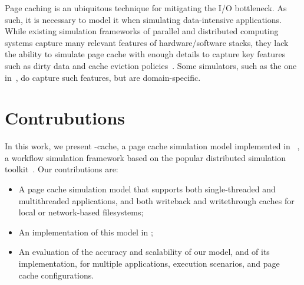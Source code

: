 Page caching is an ubiquitous technique for mitigating the I/O bottleneck.
As such, it is necessary to model it
when simulating data-intensive applications.
While existing simulation frameworks of parallel and distributed computing
systems  capture many relevant features of hardware/software stacks, 
they lack the ability to simulate page cache with enough details to capture key features such
as dirty data and cache eviction policies~\cite{nunez2012simcan,nunez2012icancloud}. 
Some simulators, such as the one in~\cite{xu2018saving}, do capture such features,
but are domain-specific. 


\section{Contrubutions}

In this work, we present \wrench-cache, a page cache simulation model
implemented in \wrench~\cite{casanova2020fgcs}, a workflow simulation
framework based on the popular \simgrid distributed simulation
toolkit~\cite{casanova2014simgrid}. Our contributions are:

\begin{itemize}
    \item A page cache simulation model that supports 
both single-threaded and multithreaded applications, and both
writeback and writethrough caches for local or network-based
filesystems;
    \item An implementation of this model in \wrench; 
    \item An evaluation of the accuracy and scalability of our model, and of its implementation,
          for multiple applications, execution scenarios, and page cache configurations. 
\end{itemize}

